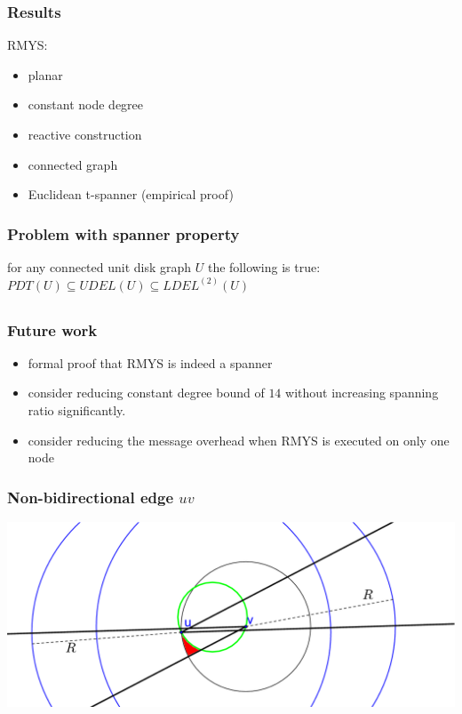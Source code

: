 \documentclass[compress]{beamer}
\begin{document}
\begin{frame}
\frametitle{Results}
RMYS:
\begin{itemize}
\item planar
\item constant node degree
\item reactive construction
\item connected graph
\item Euclidean t-spanner (empirical proof)
\end{itemize}
\end{frame}


\begin{frame}
\frametitle{Problem with spanner property}
\center for any connected unit disk graph $U $ the following is true:
\center $PDT(U) \subseteq UDEL(U) \subseteq LDEL^{(2)}(U) $
\end{frame}

\subsection{}
\begin{frame}
\frametitle{Future work}
\begin{itemize}
\item formal proof that RMYS is indeed a spanner
\item consider reducing constant degree bound of $14 $ without increasing spanning ratio significantly.
\item consider reducing the message overhead when RMYS is executed on only one node
\end{itemize}
\end{frame}

\begin{frame}
	\frametitle{Non-bidirectional edge $uv$}
	\center \includegraphics[width=1\linewidth]{RMYS_case_error_bidirectional.eps}
\end{frame}
\end{document}
